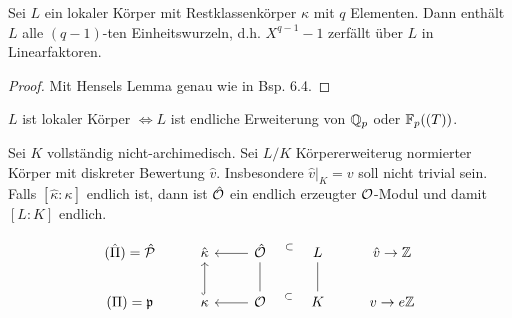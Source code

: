 
\begin{Bem}
Sei $L$ ein lokaler Körper mit Restklassenkörper $\kappa$ mit $q$ Elementen. Dann enthält $L$ alle $(q-1)$-ten Einheitswurzeln, d.h. $X^{q-1}-1$ zerfällt über $L$ in Linearfaktoren.
\end{Bem}

\begin{proof}
Mit Hensels Lemma genau wie in Bsp. 6.4.
\end{proof}

\begin{Satz}
$L$ ist lokaler Körper $\iff L$ ist endliche Erweiterung von $\mathbb{Q}_p$ oder $\mathbb{F}_p((T))$.
\end{Satz}

\begin{Lem}
Sei $K$ vollständig nicht-archimedisch. Sei $L/K$ Körpererweiterug normierter Körper mit diskreter Bewertung $\hat v$. Insbesondere $\hat v|_K=v$ soll nicht trivial sein.
Falls $[\hat \kappa: \kappa]$ endlich ist, dann ist $\hat{\mathcal{O}}$ ein endlich erzeugter $\mathcal{O}$-Modul und damit $[L:K]$ endlich.
\end{Lem}

\[\begin{tikzcd}
(\hat \Pi)=\hP & \hat \kappa & \hO \arrow[l] \arrow[draw=none, auto=falsem sloped]{r}{\subset} & L & \hat v \to \Z\\
(\Pi)=\p & \kappa \arrow[hook]{u} & \O \arrow[dash]{u} \arrow[l] \arrow[draw=none, auto=false, sloped]{r}{\subset} & K \arrow[dash]{u} &  v \to e\Z
\end{tikzcd}\]

